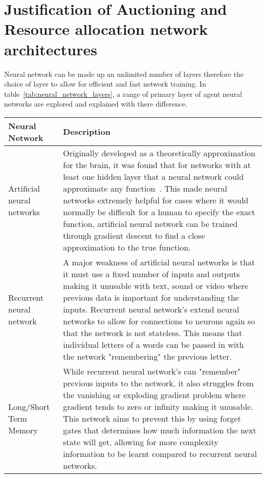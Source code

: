 \section{Justification of Auctioning and Resource allocation network architectures}\label{sec:justification-of-auctioning-and-resource-allocation-network-architectures}
Neural network can be made up an unlimited number of layers therefore the choice of layer to allow for efficient and
fast network training. In table~\ref{tab:neural_network_layers}, a range of primary layer of agent neural networks
are explored and explained with there difference.

\begin{longtable}{|p{3.5cm}|p{11cm}|} \hline
    \textbf{Neural Network} & \textbf{Description} \\ \hline
    Artificial neural networks~\citep{ANN} & Originally developed as a theoretically approximation for the brain, it
        was found that for networks with at least one hidden layer that a neural network could approximate any
        function~\citep{csaji2001approximation}. This made neural networks extremely helpful for cases where it would
        normally be difficult for a human to specify the exact function, artificial neural network can be trained
        through gradient descent to find a close approximation to the true function. \\ \hline

    Recurrent neural network~\citep{RNN} & A major weakness of artificial neural networks is that it must use a fixed
        number of inputs and outputs making it unusable with text, sound or video where previous data is important
        for understanding the inputs. Recurrent neural network's extend neural networks to allow for connections to
        neurons again so that the network is not stateless. This means that individual letters of a words can be
        passed in with the network "remembering" the previous letter. \\ \hline

    Long/Short Term Memory~\citep{LSTM} & While recurrent neural network's can "remember" previous inputs to the
        network, it also struggles from the vanishing or exploding gradient problem where gradient tends to zero or
        infinity making it unusable. This network aims to prevent this by using forget gates that determines how much
        information the next state will get, allowing for more complexity information to be learnt compared to
        recurrent neural networks. \\ \hline


\end{longtable}
